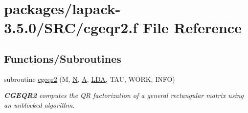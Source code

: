 \hypertarget{cgeqr2_8f}{}\section{packages/lapack-\/3.5.0/\+S\+R\+C/cgeqr2.f File Reference}
\label{cgeqr2_8f}
\subsection*{Functions/\+Subroutines}
\begin{DoxyCompactItemize}
\item 
subroutine \hyperlink{group__complexGEcomputational_ga134d9e0dc9857945b85acc090ca19ade}{cgeqr2} (M, \hyperlink{polmisc_8c_a0240ac851181b84ac374872dc5434ee4}{N}, \hyperlink{classA}{A}, \hyperlink{example__user_8c_ae946da542ce0db94dced19b2ecefd1aa}{L\+D\+A}, T\+A\+U, W\+O\+R\+K, I\+N\+F\+O)
\begin{DoxyCompactList}\small\item\em {\bfseries C\+G\+E\+Q\+R2} computes the Q\+R factorization of a general rectangular matrix using an unblocked algorithm. \end{DoxyCompactList}\end{DoxyCompactItemize}
